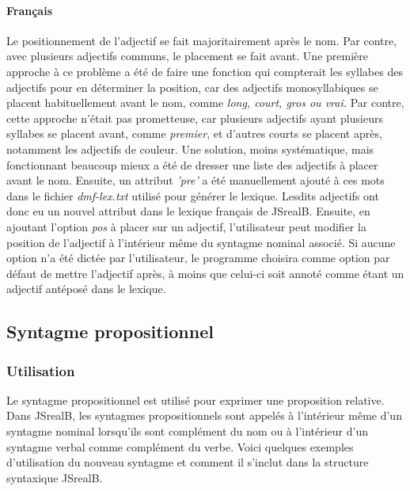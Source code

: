 \documentclass[11pt]{article} %
\newcommand{\system}[1]{\textsf{#1}}
\newcommand{\JSB}{\system{JSrealB}}
\newcommand{\code}[1]{\texttt{#1}}
\newcommand{\real}[1]{\emph{#1}}
\newcommand{\simpleExample}[2]{\begin{center}
                 \code{#1} \newline \real{#2}
                 \end{center}}
\begin{document}
\paragraph{Français}
Le positionnement de l'adjectif se fait majoritairement
après le nom. Par contre, avec plusieurs adjectifs communs, le placement
se fait avant. Une première approche à ce problème a été de faire
une fonction qui compterait les syllabes des adjectifs pour en déterminer
la position, car des adjectifs monosyllabiques se placent habituellement
avant le nom, comme \emph{long, court, gros ou vrai.} Par contre,
cette approche n'était pas prometteuse, car plusieurs adjectifs ayant
plusieurs syllabes se placent avant, comme \emph{premier}, et d'autres
courts se placent après, notamment les adjectifs de couleur. Une solution,
moins systématique, mais fonctionnant beaucoup mieux a été de dresser
une liste des adjectifs à placer avant le nom. Ensuite, un attribut
\emph{'pre'} a été manuellement ajouté à ces mots dans le fichier
\emph{dmf-lex.txt }utilisé pour générer le lexique. Lesdits adjectifs
ont donc eu un nouvel attribut dans le lexique français de \JSB{}.
Ensuite, en ajoutant l'option \emph{pos} à placer sur un adjectif,
l'utilisateur peut modifier la position de l'adjectif à l'intérieur
même du syntagme nominal associé. Si aucune option n'a été dictée
par l'utilisateur, le programme choisira comme option par défaut de
mettre l'adjectif après, à moins que celui-ci soit annoté comme étant
un adjectif antéposé dans le lexique. 


\subsection{Syntagme propositionnel}
\label{syntProp}

\subsubsection{Utilisation}

Le syntagme propositionnel est utilisé pour exprimer une proposition
relative. Dans \JSB{}, les syntagmes propositionnels sont appelés
à l'intérieur même d'un syntagme nominal lorsqu'ils sont complément
du nom ou à l'intérieur d'un syntagme verbal comme complément du verbe.
Voici quelques exemples d'utilisation du nouveau syntagme et comment
il s'inclut dans la structure syntaxique \JSB{}.

\end{document}
